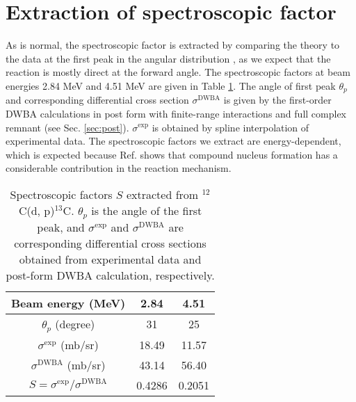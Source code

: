 \section{Extraction of spectroscopic factor}
As is normal, the spectroscopic factor is extracted by comparing the theory to the data at the first peak in the angular distribution
\cite{PhysRevC.69.064313}, as we expect that the reaction is mostly direct at the forward angle. 
The spectroscopic factors at beam energies 2.84 MeV and 4.51 MeV are given in Table \ref{tab:spec}. 
The angle of first peak $\theta_{p}$ and corresponding differential cross section $\sigma^{\mathrm{DWBA}}$ is given by the first-order DWBA calculations in post form with finite-range interactions and full complex remnant (see Sec. \ref{sec:post}). 
$\sigma^{\mathrm{exp}}$ is obtained by spline interpolation of experimental data. 
The spectroscopic factors we extract are energy-dependent, 
which is expected because Ref. \cite{PhysRev.101.209} shows that compound nucleus formation has a considerable contribution in the reaction mechanism.  
\begin{table}[bt]
	\centering
	\caption{Spectroscopic factors $S$ extracted from $^{12}$C(d, p)$^{13}$C. 
	$\theta_p$ is the angle of the first peak, and $\sigma^{\mathrm{exp}}$ and $\sigma^{\mathrm{DWBA}}$ are corresponding differential cross sections obtained from experimental data and post-form DWBA calculation, respectively. }
	\label{tab:spec}
	\begin{tabular}{ccc}
		\hline
		\hline
		Beam energy (MeV)                  & 2.84 & 4.51 \\
		\hline
		$\theta_p$ (degree)                &  31 & 25 \\
		$\sigma^{\mathrm{exp}}$ (mb/sr)    &  18.49 & 11.57 \\
		$\sigma^{\mathrm{DWBA}}$ (mb/sr)   &  43.14 & 56.40 \\
		$S=\sigma^{\mathrm{exp}}/\sigma^{\mathrm{DWBA}}$ & 0.4286  & 0.2051 \\
		\hline
		\hline
	\end{tabular}
\end{table}